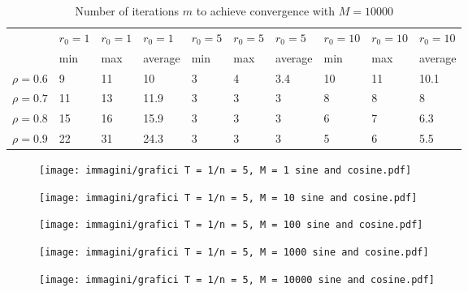 \documentclass[a4paper,11pt,openright]{report}
\begin{document}
\begin{table}[H]
\centering
\addtolength{\leftskip}{-1.5cm}
\addtolength{\rightskip}{-1.5cm}
\begin{tabular}{|c|lllllllll|}
\hline
$ $ & $r_0 = 1$ & $r_0 = 1$ & $r_0 = 1$ & $r_0 = 5$ & $r_0 = 5$ & $r_0 = 5$ & $r_0 = 10$ & $r_0 = 10$ & $r_0 = 10$  \\
$ $ & min & max & average & min & max & average & min & max & average \\ 
\hline
$\rho = 0.6$ & 9 & 11 & 10 & 3 & 4 & 3.4 & 10 & 11 & 10.1 \\

$\rho = 0.7$ & 11 & 13 & 11.9 & 3 & 3 & 3 & 8 & 8 & 8\\

$\rho = 0.8$ & 15 & 16 & 15.9 & 3 & 3 & 3 & 6 & 7 & 6.3\\

$\rho = 0.9$ & 22 & 31 & 24.3 & 3 & 3 & 3 & 5 & 6 & 5.5\\
\hline
\end{tabular}
\caption{Number of iterations $m$ to achieve convergence with $M = 10000$}
\end{table}
\begin{figure}[H]
\centering
\texttt{[image: immagini/grafici T = 1/n = 5, M = 1 sine and cosine.pdf]}
\end{figure}
\begin{figure}[H]
\centering
\texttt{[image: immagini/grafici T = 1/n = 5, M = 10 sine and cosine.pdf]}
\end{figure}
\begin{figure}[H]
\centering
\texttt{[image: immagini/grafici T = 1/n = 5, M = 100 sine and cosine.pdf]}
\end{figure}
\begin{figure}[H]
\centering
\texttt{[image: immagini/grafici T = 1/n = 5, M = 1000 sine and cosine.pdf]}
\end{figure}
\begin{figure}[H]
\centering
\texttt{[image: immagini/grafici T = 1/n = 5, M = 10000 sine and cosine.pdf]}
\end{figure}
\newpage
\end{document}

